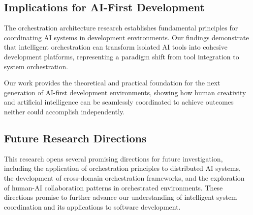 \subsection*{Implications for AI-First Development}

The orchestration architecture research establishes fundamental principles for coordinating AI systems in development environments. Our findings demonstrate that intelligent orchestration can transform isolated AI tools into cohesive development platforms, representing a paradigm shift from tool integration to system orchestration.

Our work provides the theoretical and practical foundation for the next generation of AI-first development environments, showing how human creativity and artificial intelligence can be seamlessly coordinated to achieve outcomes neither could accomplish independently.

\subsection*{Future Research Directions}

This research opens several promising directions for future investigation, including the application of orchestration principles to distributed AI systems, the development of cross-domain orchestration frameworks, and the exploration of human-AI collaboration patterns in orchestrated environments. These directions promise to further advance our understanding of intelligent system coordination and its applications to software development.
